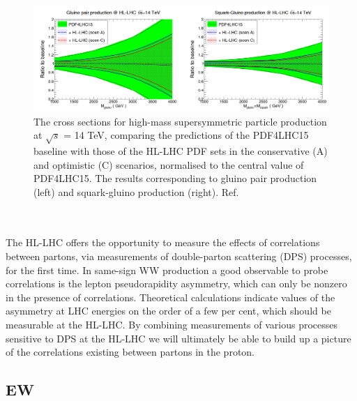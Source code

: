 \documentclass{article}
\begin{document}
\begin{figure}
\centering
\includegraphics[width=1.0\textwidth]{UltimatePDF_gluino_squark.pdf}
\caption{\label{Fig:HLLHC_kin} The cross sections for high-mass supersymmetric particle production at $\sqrt{s}$ = 14 TeV, comparing the predictions of the PDF4LHC15 baseline with those of the HL-LHC PDF sets in the conservative (A) and optimistic (C) scenarios, normalised to the central value of PDF4LHC15. The results corresponding to gluino pair production (left) and squark-gluino production (right). Ref.~\cite{Khalek:2018mdn}}
\end{figure}

\\
\\
The HL-LHC offers the opportunity to measure the effects of correlations between partons, via measurements of double-parton scattering (DPS) processes, for the first time. In same-sign WW production a good
observable to probe correlations is the lepton pseudorapidity asymmetry, which can only be nonzero in the presence of correlations. Theoretical calculations indicate values of the asymmetry at LHC energies on the
order of a few per cent, which should be measurable at the HL-LHC. By combining measurements of various processes sensitive to DPS at the HL-LHC we will ultimately be able to build up a picture of the correlations existing between partons in the proton.

\subsection{EW}
\end{document}
